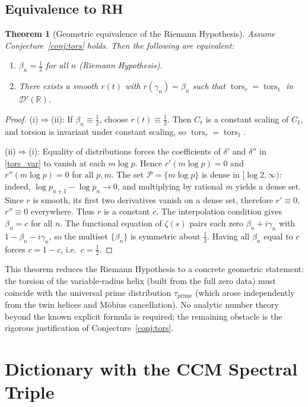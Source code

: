 \documentclass[12pt,a4paper]{article}
\newtheorem{theorem}{Theorem}[section]
\newcommand{\R}{\mathbb{R}}
\newcommand{\dist}{\mathcal{D}'}
\newcommand{\tors}{\operatorname{tors}}
\begin{document}
\subsection{Equivalence to RH}
\begin{theorem}[Geometric equivalence of the Riemann Hypothesis]\label{thm:RH}
Assume Conjecture~\ref{conj:tors} holds.  Then the following are equivalent:
\begin{enumerate}
\item[(i)] $\beta_n = \frac12$ for all $n$ (Riemann Hypothesis).
\item[(ii)] There exists a smooth $r(t)$ with $r(\gamma_n) = \beta_n$ such that $\tors_r = \tors_1$ in $\dist(\R)$.
\end{enumerate}
\end{theorem}
\begin{proof}
(i)$\Rightarrow$(ii): If $\beta_n\equiv\frac12$, choose $r(t)\equiv\frac12$.  Then $C_r$ is a constant scaling of $C_1$, and torsion is invariant under constant scaling, so $\tors_r = \tors_1$.

(ii)$\Rightarrow$(i): Equality of distributions forces the coefficients of $\delta'$ and $\delta''$ in \eqref{tors_var} to vanish at each $m\log p$.  Hence $r'(m\log p)=0$ and $r''(m\log p)=0$ for all $p,m$.  The set $\mathcal{P} = \{m\log p\}$ is dense in $[\log 2,\infty)$: indeed, $\log p_{n+1} - \log p_n \to 0$, and multiplying by rational $m$ yields a dense set.  Since $r$ is smooth, its first two derivatives vanish on a dense set, therefore $r'\equiv0$, $r''\equiv0$ everywhere.  Thus $r$ is a constant $c$.  The interpolation condition gives $\beta_n = c$ for all $n$.  The functional equation of $\zeta(s)$ pairs each zero $\beta_n + i\gamma_n$ with $1-\beta_n - i\gamma_n$, so the multiset $\{\beta_n\}$ is symmetric about $\frac12$.  Having all $\beta_n$ equal to $c$ forces $c = 1-c$, i.e.\ $c = \frac12$.
\end{proof}

This theorem reduces the Riemann Hypothesis to a concrete geometric statement: the torsion of the variable‑radius helix (built from the full zero data) must coincide with the universal prime distribution $\tau_{\mathrm{prime}}$ (which arose independently from the twin helices and M\"obius cancellation).  No analytic number theory beyond the known explicit formula is required; the remaining obstacle is the rigorous justification of Conjecture~\ref{conj:tors}.

\section{Dictionary with the CCM Spectral Triple}
\end{document}
